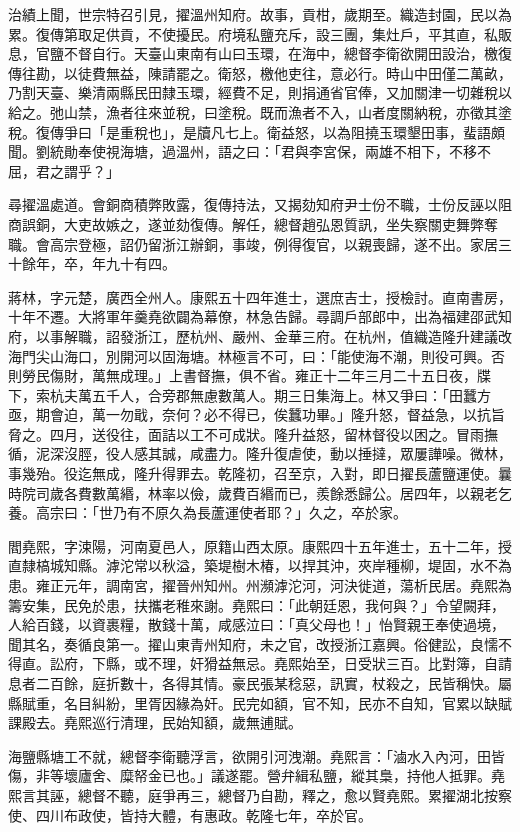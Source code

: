 \begin{pinyinscope}
治績上聞，世宗特召引見，擢溫州知府。故事，貢柑，歲期至。織造封園，民以為累。復傳第取足供貢，不使擾民。府境私鹽充斥，設三團，集灶戶，平其直，私販息，官鹽不督自行。天臺山東南有山曰玉環，在海中，總督李衛欲開田設治，檄復傳往勘，以徒費無益，陳請罷之。衛怒，檄他吏往，意必行。時山中田僅二萬畝，乃割天臺、樂清兩縣民田隸玉環，經費不足，則捐通省官俸，又加關津一切雜稅以給之。弛山禁，漁者往來並稅，曰塗稅。既而漁者不入，山者度關納稅，亦徵其塗稅。復傳爭曰「是重稅也」，是牘凡七上。衛益怒，以為阻撓玉環墾田事，蜚語頗聞。劉統勛奉使視海塘，過溫州，語之曰：「君與李宮保，兩雄不相下，不移不屈，君之謂乎？」

尋擢溫處道。會銅商積弊敗露，復傳持法，又揭劾知府尹士份不職，士份反誣以阻商誤銅，大吏故嫉之，遂並劾復傳。解任，總督趙弘恩質訊，坐失察關吏舞弊奪職。會高宗登極，詔仍留浙江辦銅，事竣，例得復官，以親喪歸，遂不出。家居三十餘年，卒，年九十有四。

蔣林，字元楚，廣西全州人。康熙五十四年進士，選庶吉士，授檢討。直南書房，十年不遷。大將軍年羹堯欲闢為幕僚，林急告歸。尋調戶部郎中，出為福建邵武知府，以事解職，詔發浙江，歷杭州、嚴州、金華三府。在杭州，值織造隆升建議改海門尖山海口，別開河以固海塘。林極言不可，曰：「能使海不潮，則役可興。否則勞民傷財，萬無成理。」上書督撫，俱不省。雍正十二年三月二十五日夜，牒下，索杭夫萬五千人，合旁郡無慮數萬人。期三日集海上。林又爭曰：「田蠶方亟，期會迫，萬一勿戢，奈何？必不得已，俟蠶功畢。」隆升怒，督益急，以抗旨脅之。四月，送役往，面詰以工不可成狀。隆升益怒，留林督役以困之。冒雨撫循，泥深沒脛，役人感其誠，咸盡力。隆升復虐使，動以捶撻，眾屢譁噪。微林，事幾殆。役迄無成，隆升得罪去。乾隆初，召至京，入對，即日擢長蘆鹽運使。曩時院司歲各費數萬緡，林率以儉，歲費百緡而已，羨餘悉歸公。居四年，以親老乞養。高宗曰：「世乃有不原久為長蘆運使者耶？」久之，卒於家。

閻堯熙，字涑陽，河南夏邑人，原籍山西太原。康熙四十五年進士，五十二年，授直隸槁城知縣。滹沱常以秋溢，築堤樹木椿，以捍其沖，夾岸種柳，堤固，水不為患。雍正元年，調南宮，擢晉州知州。州瀕滹沱河，河決徙道，蕩析民居。堯熙為籌安集，民免於患，扶攜老稚來謝。堯熙曰：「此朝廷恩，我何與？」令望闕拜，人給百錢，以資裹糧，散錢十萬，咸感泣曰：「真父母也！」怡賢親王奉使過境，聞其名，奏循良第一。擢山東青州知府，未之官，改授浙江嘉興。俗健訟，良懦不得直。訟府，下縣，或不理，奸猾益無忌。堯熙始至，日受狀三百。比對簿，自請息者二百餘，庭折數十，各得其情。豪民張某稔惡，訊實，杖殺之，民皆稱快。屬縣賦重，名目糾紛，里胥因緣為奸。民完如額，官不知，民亦不自知，官累以缺賦課殿去。堯熙巡行清理，民始知額，歲無逋賦。

海鹽縣塘工不就，總督李衛聽浮言，欲開引河洩潮。堯熙言：「滷水入內河，田皆傷，非等壞廬舍、糜帑金已也。」議遂罷。營弁緝私鹽，縱其梟，持他人抵罪。堯熙言其誣，總督不聽，庭爭再三，總督乃自勘，釋之，愈以賢堯熙。累擢湖北按察使、四川布政使，皆持大體，有惠政。乾隆七年，卒於官。


\end{pinyinscope}
